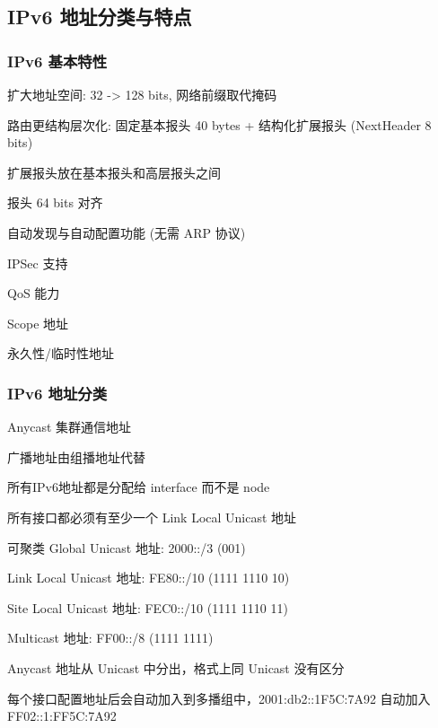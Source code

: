 \documentclass[UTF8,cs4size]{ctexart}
\begin{document}
\subsection{IPv6 地址分类与特点}
\subsubsection{IPv6 基本特性}
\begin{compactitem}
  \item 扩大地址空间: 32 -> 128 bits, 网络前缀取代掩码
  \item 路由更结构层次化: 固定基本报头 40 bytes + 结构化扩展报头 (NextHeader 8 bits)
  \item 扩展报头放在基本报头和高层报头之间
  \item 报头 64 bits 对齐
  \item 自动发现与自动配置功能 (无需 ARP 协议)
  \item IPSec 支持
  \item QoS 能力
  \item Scope 地址
  \item 永久性/临时性地址
\end{compactitem}
\subsubsection{IPv6 地址分类}
\begin{compactitem}
  \item Anycast 集群通信地址
  \item 广播地址由组播地址代替
  \item 所有IPv6地址都是分配给 interface 而不是 node
  \item 所有接口都必须有至少一个 Link Local Unicast 地址
  \item 可聚类 Global Unicast 地址: 2000::/3 (001)
  \item Link Local Unicast 地址: FE80::/10 (1111 1110 10)
  \item Site Local Unicast 地址: FEC0::/10 (1111 1110 11)
  \item Multicast 地址: FF00::/8 (1111 1111)
  \item Anycast 地址从 Unicast 中分出，格式上同 Unicast 没有区分
  \item 每个接口配置地址后会自动加入到多播组中，2001:db2::1F5C:7A92 自动加入 FF02::1:FF5C:7A92
\end{compactitem}
\end{document}
